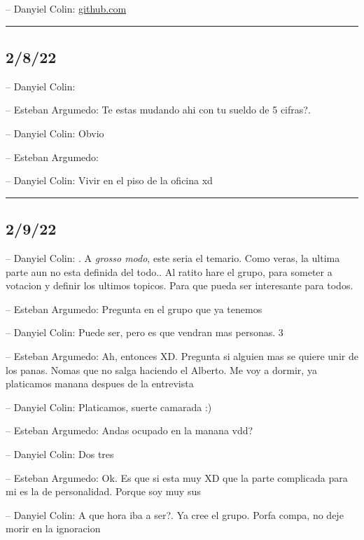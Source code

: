 -- Danyiel Colin: \href{https://github.com/zlanguage/}{github.com}

\begin{center}\rule{0.5\linewidth}{0.5pt}\end{center}

\hypertarget{section-1}{%
\subsection{2/8/22}\label{section-1}}

-- Danyiel Colin:

-- Esteban Argumedo: Te estas mudando ahi con tu sueldo de 5 cifras?.

-- Danyiel Colin: Obvio

-- Esteban Argumedo:

-- Danyiel Colin: Vivir en el piso de la oficina xd

\begin{center}\rule{0.5\linewidth}{0.5pt}\end{center}

\hypertarget{section-2}{%
\subsection{2/9/22}\label{section-2}}

-- Danyiel Colin: . A \emph{grosso modo}, este seria el temario. Como
veras, la ultima parte aun no esta definida del todo.. Al ratito hare el
grupo, para someter a votacion y definir los ultimos topicos. Para que
pueda ser interesante para todos.

-- Esteban Argumedo: Pregunta en el grupo que ya tenemos

-- Danyiel Colin: Puede ser, pero es que vendran mas personas. 3

-- Esteban Argumedo: Ah, entonces XD. Pregunta si alguien mas se quiere
unir de los panas. Nomas que no salga haciendo el Alberto. Me voy a
dormir, ya platicamos manana despues de la entrevista

-- Danyiel Colin: Platicamos, suerte camarada :)

-- Esteban Argumedo: Andas ocupado en la manana vdd?

-- Danyiel Colin: Dos tres

-- Esteban Argumedo: Ok. Es que si esta muy XD que la parte complicada
para mi es la de personalidad. Porque soy muy sus

-- Danyiel Colin: A que hora iba a ser?. Ya cree el grupo. Porfa compa,
no deje morir en la ignoracion

